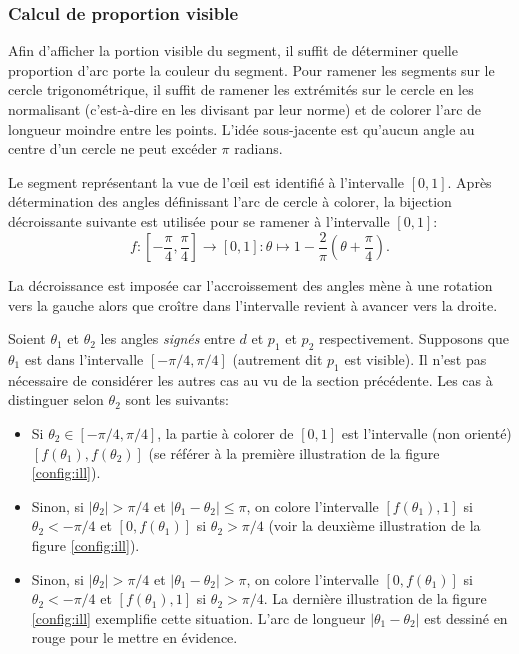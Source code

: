 \subsubsection*{Calcul de proportion visible}
Afin d'afficher la portion visible du segment,
il suffit de déterminer quelle proportion d'arc  porte la couleur du segment.
Pour ramener les segments sur le cercle trigonométrique, il suffit
de ramener les extrémités sur le cercle en les normalisant (c'est-à-dire en
les divisant par leur norme) et
de colorer l'arc de longueur moindre entre les points.
L'idée sous-jacente est qu'aucun angle au centre d'un cercle ne
peut excéder $\pi$ radians.


Le segment représentant la vue de l'\oe{}il est identifié à l'intervalle
$[0, 1]$. Après détermination des angles définissant l'arc de cercle
à colorer, la bijection décroissante suivante est utilisée pour
se ramener à l'intervalle $[0, 1]$:
$$f:\left[-\frac{\pi}{4}, \frac{\pi}{4}\right]\to [0, 1]: \theta \mapsto 1 - \frac{2}{\pi}\left(\theta + \frac{\pi}{4}\right).$$

La décroissance est imposée car l'accroissement des angles mène
à une rotation vers la gauche alors que croître dans l'intervalle
revient à avancer vers la droite.

Soient $\theta_1$ et $\theta_2$ les angles \emph{signés}
entre $d$ et $p_1$ et $p_2$
respectivement. Supposons que $\theta_1$ est dans l'intervalle $[-\pi/4, \pi/4]$
(autrement dit $p_1$ est visible). Il n'est pas nécessaire de considérer
les autres cas au vu de la section précédente. Les cas à distinguer selon
$\theta_2$ sont les suivants:

\begin{itemize}
  \item Si $\theta_2\in[-\pi/4, \pi/4]$, la partie à colorer de $[0, 1]$ est
    l'intervalle (non orienté) $[f(\theta_1), f(\theta_2)]$
    (se référer à la première illustration de la figure \ref{config:ill}).
  \item Sinon, si $|\theta_2|>\pi/4$ et $|\theta_1-\theta_2|\leq \pi$,
    on colore l'intervalle $[f(\theta_1), 1]$ si $\theta_2<-\pi/4$ et
    $[0, f(\theta_1)]$ si $\theta_2>\pi/4$
    (voir la deuxième illustration de la figure \ref{config:ill}).
  \item Sinon, si $|\theta_2|>\pi/4$ et $|\theta_1-\theta_2|> \pi$,
    on colore l'intervalle $[0, f(\theta_1)]$ si $\theta_2<-\pi/4$ et
    $[f(\theta_1), 1]$ si $\theta_2>\pi/4$. La dernière illustration
    de la figure \ref{config:ill} exemplifie cette situation. L'arc
    de longueur $|\theta_1-\theta_2|$ est dessiné en rouge
    pour le mettre en évidence.
\end{itemize}

